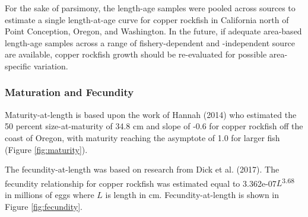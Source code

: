 \documentclass[11pt,
  english,
  a4paper,
]{article}
\begin{document}
\leavevmode\tagmcend\tagstructend\par


For the sake of parsimony, the length-age samples were pooled across sources to estimate a single length-at-age curve for copper rockfish in California north of Point Conception, Oregon, and Washington. In the future, if adequate area-based length-age samples across a range of fishery-dependent and -independent source are available, copper rockfish growth should be re-evaluated for possible area-specific variation.

\leavevmode\tagmcend\tagstructend\par


\hypertarget{maturation-and-fecundity}{%
\subsubsection{Maturation and Fecundity}\label{maturation-and-fecundity}}

\leavevmode\tagmcend\tagstructend


Maturity-at-length is based upon the work of Hannah {(2014)\leavevmode\tagmcend\tagstructend} who estimated the 50 percent size-at-maturity of 34.8 cm and slope of -0.6 for copper rockfish off the coast of Oregon, with maturity reaching the asymptote of 1.0 for larger fish (Figure \ref{fig:maturity}).

\leavevmode\tagmcend\tagstructend\par


The fecundity-at-length was based on research from Dick et al. {(2017)\leavevmode\tagmcend\tagstructend}. The fecundity relationship for copper rockfish was estimated equal to 3.362e-07{\(L\)\leavevmode\tagmcend\tagstructend}\textsuperscript{3.68} in millions of eggs where {\(L\)\leavevmode\tagmcend\tagstructend} is length in cm. Fecundity-at-length is shown in Figure \ref{fig:fecundity}.

\leavevmode\tagmcend\tagstructend\par
\end{document}
